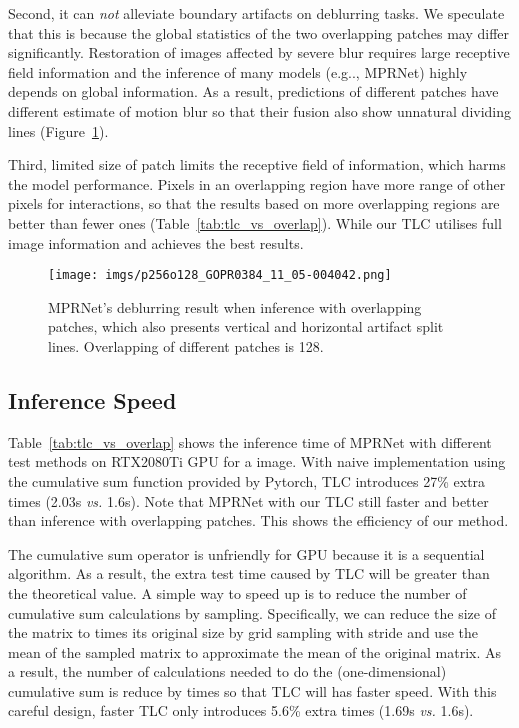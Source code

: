 \documentclass[runningheads]{llncs}
\makeatletter
\DeclareRobustCommand\onedot{\futurelet\@let@token\@onedot}
\def\@onedot{\ifx\@let@token.\else.\null\fi\xspace}
\def\eg{e.g\onedot}
\makeatother
\begin{document}
Second, it can \textit{not} alleviate boundary artifacts on deblurring tasks. We speculate that this is because the global statistics of the two overlapping patches may differ significantly. Restoration of images affected by severe blur requires large receptive field information and the inference of many models (\eg, MPRNet) highly depends on global information.
As a result, predictions of different patches have different estimate of motion blur so that their fusion also show unnatural dividing lines (Figure~\ref{fig:artifacts_p256o128}). 

Third, limited size of patch limits the receptive field of information, which harms the model performance. Pixels in an overlapping region have more range of other pixels for interactions, so that the results based on more overlapping regions are better than fewer ones (Table~\ref{tab:tlc_vs_overlap}). While our TLC utilises full image information and achieves the best results. 


\begin{figure}[t]
\centering
\texttt{[image: imgs/p256o128\_GOPR0384\_11\_05-004042.png]}
\caption{MPRNet's deblurring result when inference with overlapping  patches, which also presents vertical and horizontal artifact split lines. Overlapping of different patches is 128.}
\label{fig:artifacts_p256o128}
\vspace{-2mm}
\end{figure}
\vspace{-5mm}

\subsection{Inference Speed}
Table~\ref{tab:tlc_vs_overlap} shows the inference time of MPRNet with different test methods on RTX2080Ti GPU for a  image.
With naive implementation using the cumulative sum function provided by Pytorch, TLC introduces 27\% extra times (2.03s \textit{vs.} 1.6s). Note that MPRNet with our TLC still faster and better than inference with overlapping patches. This shows the efficiency of our method.

The cumulative sum operator is unfriendly for GPU because it is a sequential algorithm. As a result, the extra test time caused by TLC will be greater than the theoretical value. A simple way to speed up is to reduce the number of cumulative sum calculations by sampling. Specifically, we can reduce the size of the matrix to  times its original size by grid sampling with stride  and use the mean of the sampled matrix to approximate the mean of the original matrix. As a result, the number of calculations needed to do the (one-dimensional) cumulative sum is reduce by  times so that TLC will has  faster speed. 
With this careful design, faster TLC only introduces 5.6\% extra times (1.69s \textit{vs.} 1.6s). 
\end{document}
